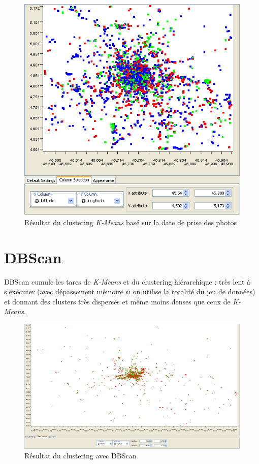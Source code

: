     \begin{figure}[H]
        \centering
        \includegraphics[scale=0.28]{../screenshots/kmeans_month.png}
        \caption{Résultat du clustering \textit{K-Means} basé sur la date de prise des photos}
        \label{diagram:kmeans_month}
    \end{figure}


\section{DBScan}
    DBScan cumule les tares de \textit{K-Means} et du clustering hiérarchique : très lent à s’exécuter (avec dépassement mémoire
    si on utilise la totalité du jeu de données) et donnant des clusters très dispersés et même moins denses que ceux de \textit{K-Means}.

    \begin{figure}[H]
        \centering
        \includegraphics[scale=0.25]{../screenshots/dbscan_geographic.png}
        \caption{Résultat du clustering avec DBScan}
        \label{diagram:dbscan_geographic}
    \end{figure}



